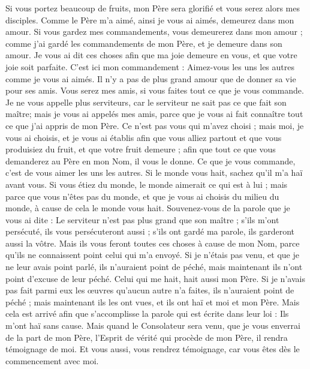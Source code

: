 \begin{multicols}{2}
Si vous portez beaucoup de fruits, mon Père sera glorifié et vous serez alors mes disciples.
Comme le Père m'a aimé, ainsi je vous ai aimés, demeurez dans mon amour.
Si vous gardez mes commandements, vous demeurerez dans mon amour ; comme j'ai gardé les commandements de mon Père, et je demeure dans son amour.
Je vous ai dit ces choses afin que ma joie demeure en vous, et que votre joie soit parfaite.
C'est ici mon commandement : Aimez-vous les uns les autres comme je vous ai aimés.
Il n'y a pas de plus grand amour que de donner sa vie pour ses amis.
Vous serez mes amis, si vous faites tout ce que je vous commande.
Je ne vous appelle plus serviteurs, car le serviteur ne sait pas ce que fait son maître; mais je vous ai appelés mes amis, parce que je vous ai fait connaître tout ce que j'ai appris de mon Père.
Ce n'est pas vous qui m'avez choisi ; mais moi, je vous ai choisis, et je vous ai établis afin que vous alliez partout et que vous produisiez du fruit, et que votre fruit demeure ; afin que tout ce que vous demanderez au Père en mon Nom, il vous le donne.
Ce que je vous commande, c'est de vous aimer les uns les autres.
Si le monde vous hait, sachez qu'il m'a haï avant vous.
Si vous étiez du monde, le monde aimerait ce qui est à lui ; mais parce que vous n'êtes pas du monde, et que je vous ai choisis du milieu du monde, à cause de cela le monde vous hait.
Souvenez-vous de la parole que je vous ai dite : Le serviteur n'est pas plus grand que son maître ; s'ils m'ont persécuté, ils vous persécuteront aussi ; s'ils ont gardé ma parole, ils garderont aussi la vôtre.
Mais ils vous feront toutes ces choses à cause de mon Nom, parce qu'ils ne connaissent point celui qui m'a envoyé.
Si je n'étais pas venu, et que je ne leur avais point parlé, ils n'auraient point de péché, mais maintenant ils n'ont point d'excuse de leur péché.
Celui qui me hait, hait aussi mon Père.
Si je n'avais pas fait parmi eux les œuvres qu'aucun autre n'a faites, ils n'auraient point de péché ; mais maintenant ils les ont vues, et ils ont haï et moi et mon Père.
Mais cela est arrivé afin que s'accomplisse la parole qui est écrite dans leur loi : Ils m'ont haï sans cause.
Mais quand le Consolateur sera venu, que je vous enverrai de la part de mon Père, l'Esprit de vérité qui procède de mon Père, il rendra témoignage de moi.
Et vous aussi, vous rendrez témoignage, car vous êtes dès le commencement avec moi.

\end{multicols}
